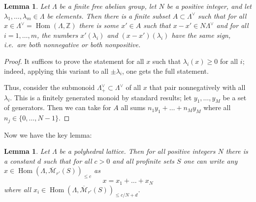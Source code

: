 \documentclass[11pt]{amsbook}
\DeclareMathOperator{\Hom}{Hom}
\numberwithin{equation}{section}
\numberwithin{theorem}{section}
\newtheorem{lemma}[theorem]{Lemma}
\theoremstyle{definition}
\begin{document}
\begin{lemma} Let $\Lambda$ be a finite free abelian group, let $N$ be a positive integer, and let $\lambda_1,\ldots,\lambda_m\in \Lambda$ be elements. Then there is a finite subset $A\subset \Lambda^\vee$ such that for all $x\in \Lambda^\vee=\Hom(\Lambda,\mathbb Z)$ there is some $x'\in A$ such that $x-x'\in N\Lambda^\vee$ and for all $i=1,\ldots,m$, the numbers $x'(\lambda_i)$ and $(x-x')(\lambda_i)$ have the same sign, i.e.~are both nonnegative or both nonpositive.
\end{lemma}

\begin{proof} It suffices to prove the statement for all $x$ such that $\lambda_i(x)\geq 0$ for all $i$; indeed, applying this variant to all $\pm \lambda_i$, one gets the full statement.

Thus, consider the submonoid $\Lambda^\vee_+\subset \Lambda^\vee$ of all $x$ that pair nonnegatively with all $\lambda_i$. This is a finitely generated monoid by standard results; let $y_1,\ldots,y_M$ be a set of generators. Then we can take for $A$ all sums $n_1y_1+\ldots+n_My_M$ where all $n_j\in \{0,\ldots,N-1\}$.
\end{proof}

Now we have the key lemma:

\begin{lemma}\label{lem:key} Let $\Lambda$ be a polyhedral lattice. Then for all positive integers $N$ there is a constant $d$ such that for all $c>0$ and all profinite sets $S$ one can write any $x\in \Hom(\Lambda,\overline{\mathcal M}_{r'}(S))_{\leq c}$ as
\[
x=x_1+\ldots+x_N
\]
where all $x_i\in \Hom(\Lambda,\overline{\mathcal M}_{r'}(S))_{\leq c/N+d}$.
\end{lemma}
\end{document}
